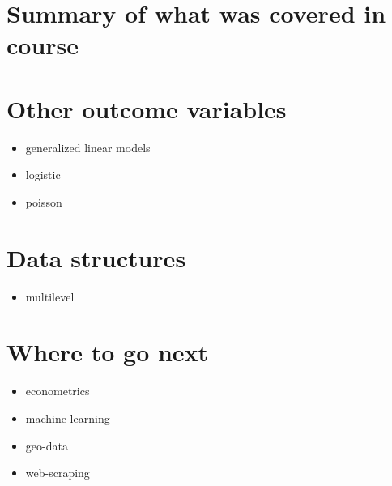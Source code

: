 \documentclass[
]{book}
\providecommand{\tightlist}{%
  \setlength{\itemsep}{0pt}\setlength{\parskip}{0pt}}
\begin{document}
\hypertarget{summary-of-what-was-covered-in-course}{%
\section{Summary of what was covered in course}\label{summary-of-what-was-covered-in-course}}

\hypertarget{other-outcome-variables}{%
\section{Other outcome variables}\label{other-outcome-variables}}

\begin{itemize}
\tightlist
\item
  generalized linear models
\item
  logistic
\item
  poisson
\end{itemize}

\hypertarget{data-structures}{%
\section{Data structures}\label{data-structures}}

\begin{itemize}
\tightlist
\item
  multilevel
\end{itemize}

\hypertarget{where-to-go-next}{%
\section{Where to go next}\label{where-to-go-next}}

\begin{itemize}
\tightlist
\item
  econometrics
\item
  machine learning
\item
  geo-data
\item
  web-scraping
\end{itemize}

  
\end{document}

